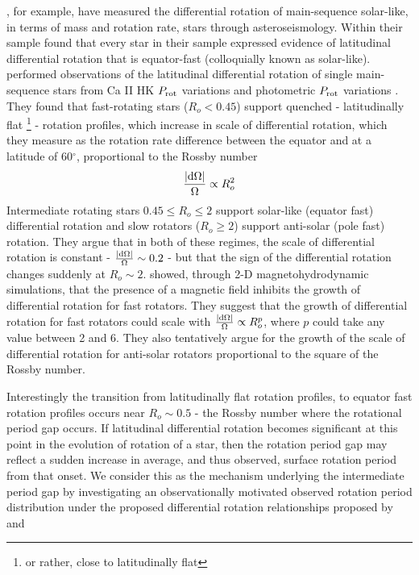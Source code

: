 \citet{benomar_nearly_2015, benomar_asteroseismic_2018, bazot_latitudinal_2019, hall_weakened_2021}, for example, have measured the differential rotation of main-sequence solar-like, in terms of mass and rotation rate, stars through asteroseismology.
Within their sample \citet{bazot_latitudinal_2019} found that every star in their sample expressed evidence of latitudinal differential rotation that is equator-fast (colloquially known as solar-like).
\citet{saar_starspots_2011} performed observations of the latitudinal differential rotation of single main-sequence stars from Ca II HK $P_{\rm{rot}}$ variations \citep[e.g.]{donahue_relationship_1996} and photometric $P_{\rm{rot}}$ variations \citep[e.g.]{messina_magnetic_2003}.
They found that fast-rotating stars ($R_o < 0.45$) support quenched - latitudinally flat \footnote{or rather, close to latitudinally flat} - rotation profiles, which increase in scale of differential rotation, which they measure as the rotation rate difference between the equator and at a latitude of 60$^{\circ}$, proportional to the Rossby number 
\begin{equation}
\frac{|\rm{d}\Omega|}{\Omega} \propto R_o^2
\end{equation}
Intermediate rotating stars $0.45\leq R_o \leq 2$ support solar-like (equator fast) differential rotation and slow rotators ($R_o\geq2$) support anti-solar (pole fast) rotation.
They argue that in both of these regimes, the scale of differential rotation is constant - $\frac{|\rm{d}\Omega|}{\Omega} \sim 0.2$ - but that the sign of the differential rotation changes suddenly at $R_o \sim 2$.
\citet{brun_powering_2022} showed, through 2-D magnetohydrodynamic simulations, that the presence of a magnetic field inhibits the growth of differential rotation for fast rotators.
They suggest that the growth of differential rotation for fast rotators could scale with $\frac{|\rm{d}\Omega|}{\Omega} \propto R_o^p$, where $p$ could take any value between 2 and 6.
They also tentatively argue for the growth of the scale of differential rotation for anti-solar rotators proportional to the square of the Rossby number.

Interestingly the transition from latitudinally flat rotation profiles, to equator fast rotation profiles occurs near $R_o \sim 0.5$ - the Rossby number where the rotational period gap occurs.
If latitudinal differential rotation becomes significant at this point in the evolution of rotation of a star, then the rotation period gap may reflect a sudden increase in average, and thus observed, surface rotation period from that onset.
We consider this as the mechanism underlying the intermediate period gap by investigating an observationally motivated observed rotation period distribution under the proposed differential rotation relationships proposed by \citet{saar_starspots_2011} and \citet{brun_powering_2022}

